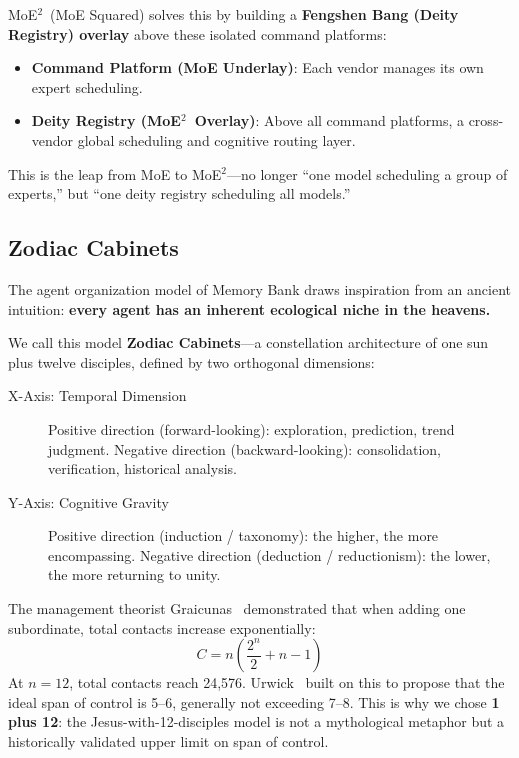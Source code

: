 \documentclass[11pt,a4paper]{article}
\newcommand{\moetwo}{MoE$^2$}
\begin{document}
\moetwo\ (MoE Squared) solves this by building a \textbf{Fengshen Bang (Deity Registry) overlay} above these isolated command platforms:

\begin{itemize}
  \item \textbf{Command Platform (MoE Underlay)}: Each vendor manages its own expert scheduling.
  \item \textbf{Deity Registry (\moetwo\ Overlay)}: Above all command platforms, a cross-vendor global scheduling and cognitive routing layer.
\end{itemize}

This is the leap from MoE to \moetwo---no longer ``one model scheduling a group of experts,'' but ``one deity registry scheduling all models.''

\subsection{Zodiac Cabinets}
\label{sub:zodiac}

The agent organization model of Memory Bank draws inspiration from an ancient intuition: \textbf{every agent has an inherent ecological niche in the heavens.}

We call this model \textbf{Zodiac Cabinets}---a constellation architecture of one sun plus twelve disciples, defined by two orthogonal dimensions:

\begin{description}
  \item[X-Axis: Temporal Dimension] Positive direction (forward-looking): exploration, prediction, trend judgment. Negative direction (backward-looking): consolidation, verification, historical analysis.
  \item[Y-Axis: Cognitive Gravity] Positive direction (induction / taxonomy): the higher, the more encompassing. Negative direction (deduction / reductionism): the lower, the more returning to unity.
\end{description}

The management theorist Graicunas~\cite{graicunas1933} demonstrated that when adding one subordinate, total contacts increase exponentially:
\begin{equation}
\label{eq:graicunas}
C = n\!\left(\frac{2^{n}}{2} + n - 1\right)
\end{equation}
At $n=12$, total contacts reach 24{,}576.
Urwick~\cite{urwick1956} built on this to propose that the ideal span of control is 5--6, generally not exceeding 7--8.
This is why we chose \textbf{1 plus 12}: the Jesus-with-12-disciples model is not a mythological metaphor but a historically validated upper limit on span of control.
\end{document}
